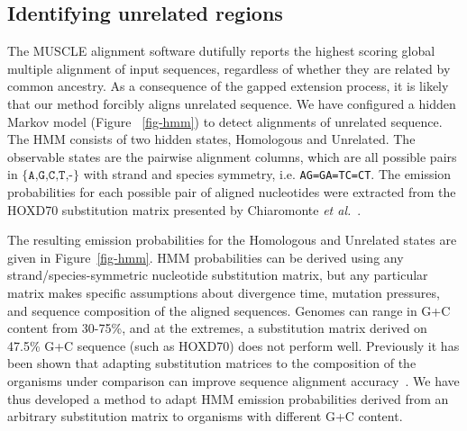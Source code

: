 \documentclass[10pt,journal,letterpaper,compsoc,peerreview]{IEEEtran}
\begin{document}
\subsection{Identifying unrelated regions}
\begin{figure*}[t!]
\centering {}
\caption[Hidden Markov model used to detect pairwise alignments of unrelated
sequence]%
{\textbf{Hidden Markov model used to detect pairwise alignments of unrelated
sequence.} The HMM has states which model alignment columns containing
homologous and unrelated sequence. Emission probabilities are extracted from the HOXD70 substitution matrix and correspond to alignment
columns, for example \texttt{AA} indicates A aligned to A.  gO
indicates gap-open and gE gap extend. Alignment columns are treated as
strand-symmetric, so that AC also indicates CA and the reverse
complements TG and GT.  The emission probabilities are adjusted to the G+C content of the input genome
as described in the test.  The values shown here correspond to a 47.5\% G+C genome.}
\label{fig-hmm}
\end{figure*}
The MUSCLE alignment software dutifully reports the highest scoring
global multiple alignment of input sequences, regardless of whether
they are related by common ancestry. As a consequence of the gapped
extension process, it is likely that our method forcibly aligns unrelated
sequence. We have configured a hidden Markov model (Figure
~\ref{fig-hmm}) to detect alignments of unrelated sequence. The HMM
consists of two hidden states, Homologous and Unrelated. The
observable states are the pairwise alignment columns, which are all
possible pairs in $\texttt{{\{A,G,C,T,-\}}}$ with strand and species
symmetry, i.e. \texttt{AG=GA=TC=CT}. The emission probabilities for
each possible pair of aligned nucleotides were extracted from the HOXD70
substitution matrix presented by Chiaromonte \textit{et al.}~\cite{hoxd}.

The resulting emission
probabilities for the Homologous and Unrelated states are given
in Figure~\ref{fig-hmm}. HMM probabilities can be derived using any strand/species-symmetric nucleotide substitution matrix,
but any particular matrix makes specific assumptions about divergence time, mutation pressures,
and sequence composition of the aligned sequences.
Genomes can range in G+C content from 30-75\%, and at the extremes,
a substitution matrix derived on 47.5\% G+C sequence (such as HOXD70) does not
perform well. Previously it has been shown that adapting substitution matrices to the composition
of the organisms under comparison can improve sequence alignment accuracy~\cite{ref-rev3b}.  We have thus developed a method to adapt HMM emission
probabilities derived from an arbitrary substitution matrix
to organisms with different G+C content.
\end{document}
